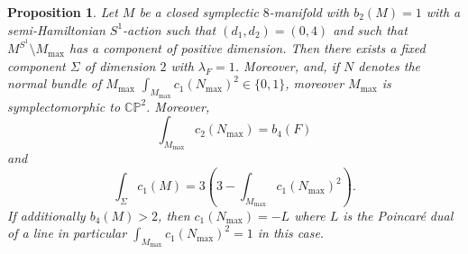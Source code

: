 \documentclass[12pt]{article}
\newtheorem{proposition}[theorem]{Proposition}
\begin{document}
\begin{proposition} \label{zerofourcasetwo}
Let $M$ be a closed symplectic $8$-manifold with $b_{2}(M)=1$ with a semi-Hamiltonian $S^1$-action  such that $(d_1,d_2)=(0,4)$ and such that $M^{S^1} \setminus M_{\max}$ has a component of positive dimension. Then there exists a fixed component $\Sigma$ of dimension $2$ with $\lambda_{F}=1$. Moreover, and, if $N$ denotes the normal bundle of $M_{\max}$ $\int_{M_{\max}} c_{1}(N_{\max})^2 \in \{0,1\}$, moreover $M_{\max}$ is symplectomorphic to $\mathbb{CP}^2$. Moreover, $$\int_{M_{\max}}c_{2}(N_{\max}) = b_{4}(F)$$ and  $$\int_{\Sigma} c_{1}(M)  = 3(3- \int_{M_{\max}} c_{1}(N_{\max})^2).$$If additionally  $b_{4}(M) > 2$, then $c_{1}(N_{\max})=-L$ where $L$ is the Poincar\'{e} dual of a line in particular $\int_{M_{\max}} c_{1}(N_{\max})^2 =1$ in this case.
\end{proposition}
\end{document}
